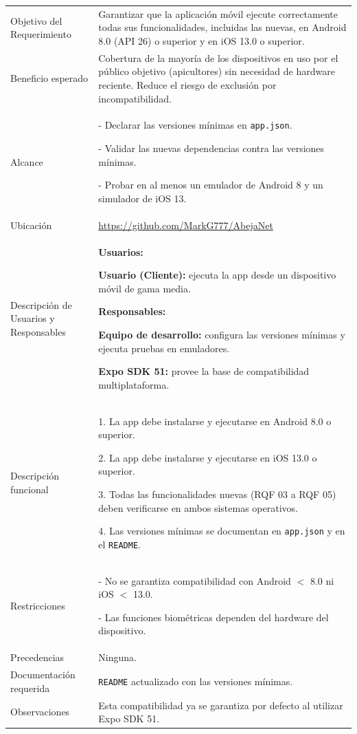 \noindent
\begin{tabular}{|p{4.5cm}|p{11cm}|}
\hline
\rowcolor{secVerde}\multicolumn{2}{|l|}{\color{white}\textbf{3. DESCRIPCIÓN DEL REQUERIMIENTO}} \\
\hline
Objetivo del Requerimiento &
Garantizar que la aplicación móvil ejecute correctamente todas sus funcionalidades, incluidas las nuevas, en Android 8.0 (API 26) o superior y en iOS 13.0 o superior. \\
\hline
Beneficio esperado &
Cobertura de la mayoría de los dispositivos en uso por el público objetivo (apicultores) sin necesidad de hardware reciente. Reduce el riesgo de exclusión por incompatibilidad. \\
\hline
Alcance &
- Declarar las versiones mínimas en \texttt{app.json}. \par
- Validar las nuevas dependencias contra las versiones mínimas. \par
- Probar en al menos un emulador de Android 8 y un simulador de iOS 13. \\
\hline
Ubicación & \url{https://github.com/MarkG777/AbejaNet} \\ \hline
Descripción de Usuarios y Responsables &
\textbf{Usuarios:} \par
\textbf{Usuario (Cliente):} ejecuta la app desde un dispositivo móvil de gama media. \par
\vspace{0.1cm}
\textbf{Responsables:} \par
\textbf{Equipo de desarrollo:} configura las versiones mínimas y ejecuta pruebas en emuladores. \par
\textbf{Expo SDK 51:} provee la base de compatibilidad multiplataforma. \\
\hline
Descripción funcional &
1. La app debe instalarse y ejecutarse en Android 8.0 o superior. \par
2. La app debe instalarse y ejecutarse en iOS 13.0 o superior. \par
3. Todas las funcionalidades nuevas (RQF 03 a RQF 05) deben verificarse en ambos sistemas operativos. \par
4. Las versiones mínimas se documentan en \texttt{app.json} y en el \texttt{README}. \\
\hline
Restricciones &
- No se garantiza compatibilidad con Android $<$ 8.0 ni iOS $<$ 13.0. \par
- Las funciones biométricas dependen del hardware del dispositivo. \\
\hline
Precedencias & Ninguna. \\ \hline
Documentación requerida & \texttt{README} actualizado con las versiones mínimas. \\ \hline
Observaciones & Esta compatibilidad ya se garantiza por defecto al utilizar Expo SDK 51. \\ \hline
\end{tabular}

